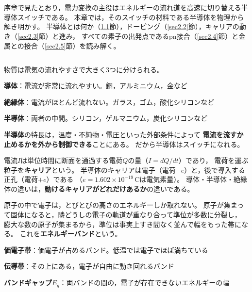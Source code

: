 \chapter{}
\label{chap2}

序章で見たとおり，電力変換の主役はエネルギーの流れ道を高速に切り替える半導体スイッチである。
本章では，そのスイッチの材料である半導体を物理から解き明かす。
半導体とは何か（\ref{sec2.1}節），ドーピング（\ref{sec2.2}節），キャリアの動き（\ref{sec2.3}節）と進み，
すべての素子の出発点であるpn接合（\ref{sec2.4}節）と金属との接合（\ref{sec2.5}節）を読み解く。

\section{}
\label{sec2.1}

物質は電気の流れやすさで大きく3つに分けられる。

\begin{箇条書}
\item \textbf{導体}：電流が非常に流れやすい。銅，アルミニウム，金など
\item \textbf{絶縁体}：電流がほとんど流れない。ガラス，ゴム，酸化シリコンなど
\item \textbf{半導体}：両者の中間。シリコン，ゲルマニウム，炭化シリコンなど
\end{箇条書}

\textbf{半導体}の特長は，温度・不純物・電圧といった外部条件によって
\textbf{電流を流すか止めるかを外から制御できる}ことにある。
だから半導体はスイッチになれる。

電流$I$は単位時間に断面を通過する電荷$Q$の量（$I = dQ/dt$）であり，
電荷を運ぶ粒子を\textbf{キャリア}という。
半導体のキャリアは電子（電荷$-e$）と，後で導入する正孔（電荷$+e$）である
（$e = 1.602\times10^{-19}$\,Cは電気素量）。
導体・半導体・絶縁体の違いは，\textbf{動けるキャリアがどれだけあるか}の違いである。

原子の中で電子は，とびとびの高さのエネルギーしか取れない。
原子が集まって固体になると，隣どうしの電子の軌道が重なり合って準位が多数に分裂し，
膨大な数の原子が集まるから，準位は事実上すき間なく並んで幅をもった帯になる。
これを\textbf{エネルギーバンド}という。

\begin{定義}
\label{def2.1}
\begin{箇条書}
\item {}\textbf{価電子帯}：価電子が占めるバンド。低温では電子でほぼ満ちている
\item {}\textbf{伝導帯}：その上にある，電子が自由に動き回れるバンド
\item {}\textbf{バンドギャップ}$E_g$：両バンドの間の，電子が存在できないエネルギーの幅
\end{箇条書}
\end{定義}

